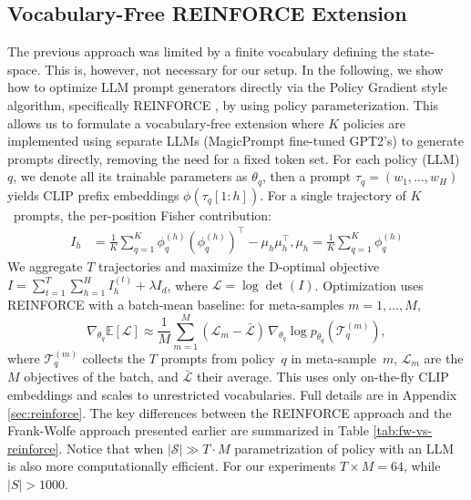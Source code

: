 \documentclass{article}
\begin{document}
\vspace{-0.2cm} \subsection{Vocabulary-Free REINFORCE Extension}
The previous approach was limited by a finite vocabulary defining the state-space. This is, however, not necessary for our setup. In the following, we show how to optimize LLM prompt generators directly via the Policy Gradient style algorithm, specifically REINFORCE \citep{williams1992simple}, by using policy parameterization.
\label{sec:reinforce_preview}
This allows us to formulate a vocabulary-free extension where $K$ policies are implemented using separate LLMs (MagicPrompt fine-tuned GPT2's) to generate prompts directly, removing the need for a fixed token set. For each policy (LLM)~$q$, we denote all its trainable parameters as $\theta_q$, then a prompt $\tau_q{=}(w_1,\ldots,w_H)$ yields CLIP prefix embeddings $\phi(\tau_q[1{:}h])$. For a single trajectory of $K$~prompts, the per-position Fisher contribution:
\begin{align}
I_h &= \frac{1}{K}\sum_{q=1}^K \phi_q^{(h)}(\phi_q^{(h)})^\top - \mu_h\mu_h^\top , \mu_h = \frac{1}{K}\sum_{q=1}^K \phi_q^{(h)}\nonumber
\end{align}
We aggregate $T$ trajectories and maximize the D-optimal objective
$I = \sum_{t=1}^{T}\sum_{h=1}^{H} I_h^{(t)} + \lambda I_d$, where $\mathcal{L}=\log\det(I)$.
Optimization uses REINFORCE \citep{williams1992simple} with a batch-mean baseline: for meta-samples $m=1,\ldots,M$,
\begin{equation}
\nabla_{\theta_q}\mathbb{E}[\mathcal{L}]
\approx \frac{1}{M}\sum_{m=1}^{M}(\mathcal{L}_m-\bar{\mathcal{L}})\,
\nabla_{\theta_q}\log p_{\theta_q}(\mathcal{T}_q^{(m)}),
\end{equation}
where $\mathcal{T}_q^{(m)}$ collects the $T$ prompts from policy~$q$ in meta-sample~$m$, $\mathcal{L}_m$ are the $M$ objectives of the batch, and $\bar{\mathcal{L}}$ their average. This uses only on-the-fly CLIP embeddings and scales to unrestricted vocabularies. Full details are in Appendix \ref{sec:reinforce}. The key differences between the REINFORCE approach and the Frank-Wolfe approach presented earlier are summarized in Table \ref{tab:fw-vs-reinforce}. Notice that when $|\mathcal{S}| \gg T \cdot M$ parametrization of policy with an LLM is also more computationally efficient. For our experiments $T\times M=64$, while $|S|>1000$.
\end{document}
